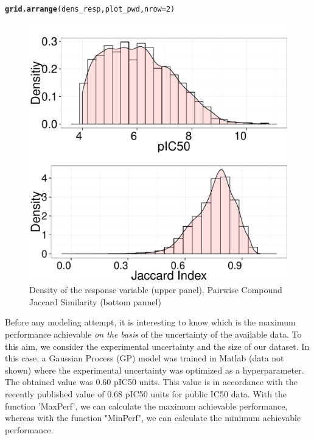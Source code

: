 \documentclass[twoside,a4wide,12pt]{article}\usepackage[]{graphicx}\usepackage[]{color}
\makeatletter
\def\maxwidth{ %
  \ifdim\Gin@nat@width>\linewidth
    \linewidth
  \else
    \Gin@nat@width
  \fi
}
\newcommand{\hlnum}[1]{\textcolor[rgb]{0.686,0.059,0.569}{#1}}%
\newcommand{\hlstd}[1]{\textcolor[rgb]{0.345,0.345,0.345}{#1}}%
\newcommand{\hlkwc}[1]{\textcolor[rgb]{0.333,0.667,0.333}{#1}}%
\newcommand{\hlkwd}[1]{\textcolor[rgb]{0.737,0.353,0.396}{\textbf{#1}}}%
\newenvironment{kframe}{%
 \def\at@end@of@kframe{}%
 \ifinner\ifhmode%
  \def\at@end@of@kframe{\end{minipage}}%
  \begin{minipage}{\columnwidth}%
 \fi\fi%
 \def\FrameCommand##1{\hskip\@totalleftmargin \hskip-\fboxsep
 \colorbox{shadecolor}{##1}\hskip-\fboxsep
     \hskip-\linewidth \hskip-\@totalleftmargin \hskip\columnwidth}%
 \MakeFramed {\advance\hsize-\width
   \@totalleftmargin\z@ \linewidth\hsize
   \@setminipage}}%
 {\par\unskip\endMakeFramed%
 \at@end@of@kframe}
\newenvironment{knitrout}{}{} %
\makeatother
\begin{document}
\begin{knitrout}
\color{fgcolor}\begin{kframe}
\begin{alltt}
\hlkwd{grid.arrange}\hlstd{(dens_resp, plot_pwd,} \hlkwc{nrow} \hlstd{=} \hlnum{2}\hlstd{)}
\end{alltt}
\end{kframe}\begin{figure}

{\centering \includegraphics[width=\maxwidth]{figure/unnamed-chunk-25-1} 

}

\caption[Density of the response variable (upper panel)]{Density of the response variable (upper panel). Pairwise Compound Jaccard Similarity (bottom pannel)}\label{fig:unnamed-chunk-25}
\end{figure}


\end{knitrout}

Before any modeling attempt, it is interesting to know which is the maximum performance achievable {\it on the basis} of the uncertainty of the available data.\cite{cortesGP}
To this aim, we consider the experimental uncertainty and the size of our dataset. 
In this case, a Gaussian Process (GP) model was trained in Matlab (data not shown) where the experimental uncertainty was optimized as a hyperparameter. The obtained value was 0.60 pIC50 units.
This value is in accordance with the recently published value of 0.68 pIC50 units for public IC50 data.\cite{Kalliokoski2013}
With the function 'MaxPerf', we can calculate the maximum achievable performance, whereas with the function "MinPerf",
we can calculate the minimum achievable performance.
\end{document}
